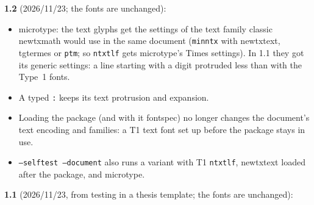 \documentclass[11pt,a4paper]{article}
\begin{document}
\textbf{1.2} (2026/11/23; the fonts are unchanged):
\begin{itemize}
\item \textsf{microtype}: the text glyphs get the settings of the text family classic
  \textsf{newtxmath} would use in the same document (\texttt{minntx} with \textsf{newtxtext},
  \textsf{tgtermes} or \texttt{ptm}; so \texttt{ntxtlf} gets \textsf{microtype}'s Times
  settings). In 1.1 they got its generic settings: a line starting with a digit protruded
  less than with the Type~1 fonts.
\item A typed \texttt{:} keeps its text protrusion and expansion.
\item Loading the package (and with it \textsf{fontspec}) no longer changes the document's text
  encoding and families: a T1 text font set up before the package stays in use.
\item \texttt{--selftest --document} also runs a variant with T1 \texttt{ntxtlf},
  \textsf{newtxtext} loaded after the package, and \textsf{microtype}.
\end{itemize}
\textbf{1.1} (2026/11/23, from testing in a thesis template; the fonts are unchanged):
\end{document}
